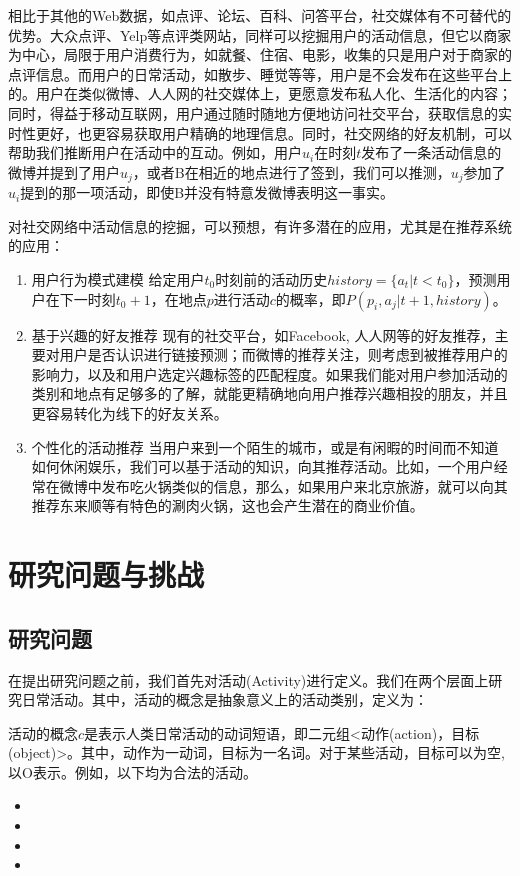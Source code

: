 相比于其他的Web数据，如点评、论坛、百科、问答平台，社交媒体有不可替代的优势。大众点评、Yelp等点评类网站，同样可以挖掘用户的活动信息，但它以商家为中心，局限于用户消费行为，如就餐、住宿、电影，收集的只是用户对于商家的点评信息。而用户的日常活动，如散步、睡觉等等，用户是不会发布在这些平台上的。用户在类似微博、人人网的社交媒体上，更愿意发布私人化、生活化的内容；同时，得益于移动互联网，用户通过随时随地方便地访问社交平台，获取信息的实时性更好，也更容易获取用户精确的地理信息。同时，社交网络的好友机制，可以帮助我们推断用户在活动中的互动。例如，用户$u_i$在时刻$t$发布了一条活动信息的微博并提到了用户$u_j$，或者B在相近的地点进行了签到，我们可以推测，$u_j$参加了$u_i$提到的那一项活动，即使B并没有特意发微博表明这一事实。

对社交网络中活动信息的挖掘，可以预想，有许多潜在的应用，尤其是在推荐系统的应用：
\begin{enumerate}
\item{\heiti 用户行为模式建模} 给定用户$t_0$时刻前的活动历史$history = \{a_t|t<t_0\}$，预测用户在下一时刻$t_0+1$，在地点$p$进行活动$c$的概率，即$P(p_i, a_j|t+1,history)$。
\item{\heiti 基于兴趣的好友推荐} 现有的社交平台，如Facebook, 人人网等的好友推荐，主要对用户是否认识进行链接预测；而微博的推荐关注，则考虑到被推荐用户的影响力，以及和用户选定兴趣标签的匹配程度。如果我们能对用户参加活动的类别和地点有足够多的了解，就能更精确地向用户推荐兴趣相投的朋友，并且更容易转化为线下的好友关系。
\item{\heiti 个性化的活动推荐} 当用户来到一个陌生的城市，或是有闲暇的时间而不知道如何休闲娱乐，我们可以基于活动的知识，向其推荐活动。比如，一个用户经常在微博中发布吃火锅类似的信息，那么，如果用户来北京旅游，就可以向其推荐东来顺等有特色的涮肉火锅，这也会产生潜在的商业价值。
\end{enumerate}

\section{研究问题与挑战}
\subsection{研究问题}
在提出研究问题之前，我们首先对活动(Activity)进行定义。我们在两个层面上研究日常活动。其中，活动的概念是抽象意义上的活动类别，定义为：
\begin{definition}
活动的概念$c$是表示人类日常活动的动词短语，即二元组<动作(action)，目标(object)>。其中，动作为一动词，目标为一名词。对于某些活动，目标可以为空,以O表示。例如，以下均为合法的活动。
\label{def:instance}
\begin{itemize}
\item <吃,烤鸭>
\item <参加,会议>
\item <游泳,O>
\item <旅游,O>
\end{itemize}
\label{def:concept}
\end{definition}

